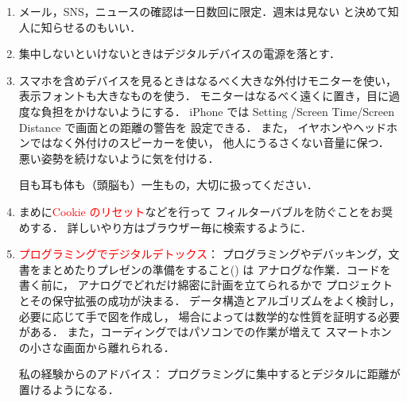 \begin{enumerate}
\begin{enumerate}
      \item
         メール，SNS，ニュースの確認は一日数回に限定．週末は見ない
         と決めて知人に知らせるのもいい．
      
      \item
         集中しないといけないときはデジタルデバイスの電源を落とす．
            
      \item
         スマホを含めデバイスを見るときはなるべく大きな外付けモニターを使い，
         表示フォントも大きなものを使う．
         モニターはなるべく遠くに置き，目に過度な負担をかけないようにする．
         iPhone では Setting /Screen Time/Screen Distance で画面との距離の警告を
         設定できる．
         また，
         イヤホンやヘッドホンではなく外付けのスピーカーを使い，
         他人にうるさくない音量に保つ．
         悪い姿勢を続けないように気を付ける．
         
         目も耳も体も（頭脳も）一生もの，大切に扱ってください．
      \item
         まめに\textcolor{red}{Cookie のリセット}などを行って
         フィルターバブルを防ぐことをお奨めする．
         詳しいやり方はブラウザー毎に検索するように．
      \item
         \textcolor{red}{プログラミングでデジタルデトックス}：
         プログラミングやデバッキング，文書をまとめたりプレゼンの準備をすること(\cite{R}) は
         アナログな作業．コードを書く前に，
         アナログでどれだけ綿密に計画を立てられるかで
         プロジェクトとその保守拡張の成功が決まる．
         データ構造とアルゴリズムをよく検討し，
         必要に応じて手で図を作成し，
         場合によっては数学的な性質を証明する必要がある．
         また，コーディングではパソコンでの作業が増えて
         スマートホンの小さな画面から離れられる．
         
         私の経験からのアドバイス：
         プログラミングに集中するとデジタルに距離が置けるようになる．
   \end{enumerate}
   
%   
%   
%   		
%   	
%   	
\end{enumerate}

